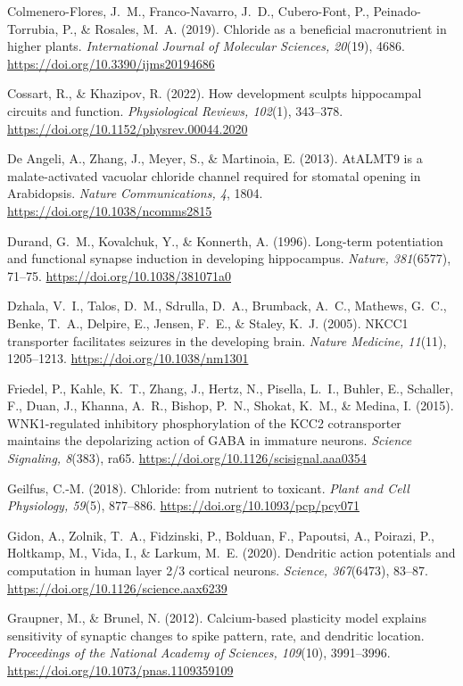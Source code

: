 \documentclass[11pt,a4paper]{article}
\newenvironment{apabib}{\raggedright\begin{list}{}{%
  \setlength{\leftmargin}{1.6em}\setlength{\itemindent}{-1.6em}%
  \setlength{\itemsep}{3pt}\setlength{\parsep}{0pt}\setlength{\topsep}{4pt}}}%
  {\end{list}}
\begin{document}
\begin{apabib}
\item Colmenero-Flores, J.~M., Franco-Navarro, J.~D., Cubero-Font, P., Peinado-Torrubia, P., \& Rosales, M.~A. (2019). Chloride as a beneficial macronutrient in higher plants. \emph{International Journal of Molecular Sciences, 20}(19), 4686. \url{https://doi.org/10.3390/ijms20194686}
\item Cossart, R., \& Khazipov, R. (2022). How development sculpts hippocampal circuits and function. \emph{Physiological Reviews, 102}(1), 343--378. \url{https://doi.org/10.1152/physrev.00044.2020}
\item De Angeli, A., Zhang, J., Meyer, S., \& Martinoia, E. (2013). AtALMT9 is a malate-activated vacuolar chloride channel required for stomatal opening in Arabidopsis. \emph{Nature Communications, 4}, 1804. \url{https://doi.org/10.1038/ncomms2815}
\item Durand, G.~M., Kovalchuk, Y., \& Konnerth, A. (1996). Long-term potentiation and functional synapse induction in developing hippocampus. \emph{Nature, 381}(6577), 71--75. \url{https://doi.org/10.1038/381071a0}
\item Dzhala, V.~I., Talos, D.~M., Sdrulla, D.~A., Brumback, A.~C., Mathews, G.~C., Benke, T.~A., Delpire, E., Jensen, F.~E., \& Staley, K.~J. (2005). NKCC1 transporter facilitates seizures in the developing brain. \emph{Nature Medicine, 11}(11), 1205--1213. \url{https://doi.org/10.1038/nm1301}
\item Friedel, P., Kahle, K.~T., Zhang, J., Hertz, N., Pisella, L.~I., Buhler, E., Schaller, F., Duan, J., Khanna, A.~R., Bishop, P.~N., Shokat, K.~M., \& Medina, I. (2015). WNK1-regulated inhibitory phosphorylation of the KCC2 cotransporter maintains the depolarizing action of GABA in immature neurons. \emph{Science Signaling, 8}(383), ra65. \url{https://doi.org/10.1126/scisignal.aaa0354}
\item Geilfus, C.-M. (2018). Chloride: from nutrient to toxicant. \emph{Plant and Cell Physiology, 59}(5), 877--886. \url{https://doi.org/10.1093/pcp/pcy071}
\item Gidon, A., Zolnik, T.~A., Fidzinski, P., Bolduan, F., Papoutsi, A., Poirazi, P., Holtkamp, M., Vida, I., \& Larkum, M.~E. (2020). Dendritic action potentials and computation in human layer 2/3 cortical neurons. \emph{Science, 367}(6473), 83--87. \url{https://doi.org/10.1126/science.aax6239}
\item Graupner, M., \& Brunel, N. (2012). Calcium-based plasticity model explains sensitivity of synaptic changes to spike pattern, rate, and dendritic location. \emph{Proceedings of the National Academy of Sciences, 109}(10), 3991--3996. \url{https://doi.org/10.1073/pnas.1109359109}

\end{apabib}
\end{document}
